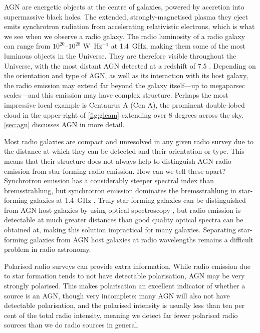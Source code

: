     AGN are energetic objects at the centre of galaxies, powered by accretion into supermassive black holes. The extended, strongly-magnetised plasma they eject emits synchrotron radiation from accelerating relativistic electrons, which is what we see when we observe a radio galaxy. The radio luminosity of a radio galaxy can range from $10^{20}$--$10^{28}$ W~Hz$^{-1}$ \citep{pracy16rlf} at 1.4~GHz, making them some of the most luminous objects in the Universe. They are therefore visible throughout the Universe, with the most distant AGN detected at a redshift of 7.5 \citep{banados_800-million-solar-mass_2018}. Depending on the orientation and type of AGN, as well as its interaction with its host galaxy, the radio emission may extend far beyond the galaxy itself---up to megaparsec scales---and this emission may have complex structure. Perhaps the most impressive local example is Centaurus A (Cen A), the prominent double-lobed cloud in the upper-right of \autoref{fig:gleam} extending over 8 degrees across the sky. \autoref{sec:agn} discusses AGN in more detail.

    Most radio galaxies are compact and unresolved in any given radio survey due to the distance at which they can be detected and their orientation or type. This means that their structure does not always help to distinguish AGN radio emission from star-forming radio emission. How can we tell these apart? Synchrotron emission has a considerably steeper spectral index than bremsstrahlung, but synchrotron emission dominates the bremsstrahlung in star-forming galaxies at 1.4~GHz \citep{condon92radio}. Truly star-forming galaxies can be distinguished from AGN host galaxies by using optical spectroscopy \citep[e.g.][]{mauch07rlf,groves_distinguishing_2007}, but radio emission is detectable at much greater distances than good quality optical spectra can be obtained at, making this solution impractical for many galaxies. Separating star-forming galaxies from AGN host galaxies at radio wavelengths remains a difficult problem in radio astronomy.

    Polarised radio surveys can provide extra information. While radio emission due to star formation tends to not have detectable polarisation, AGN may be very strongly polarised. This makes polarisation an excellent indicator of whether a source is an AGN, though very incomplete: many AGN will also not have detectable polarisation, and the polarised intensity is usually less than ten per cent of the total radio intensity, meaning we detect far fewer polarised radio sources than we do radio sources in general.

